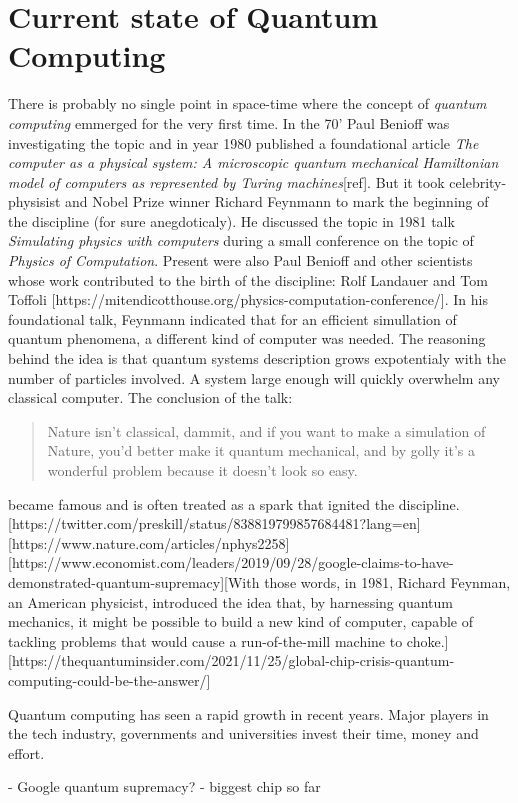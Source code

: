 \chapter{Current state of Quantum Computing}
There is probably no single point in space-time where the concept of \textit{quantum computing} emmerged for the very first time. In the 70' Paul Benioff was investigating the topic and in year 1980 published a foundational article \textit{The computer as a physical system: A microscopic quantum mechanical Hamiltonian model of computers as represented by Turing machines}[ref]. But it took celebrity-physisist and Nobel Prize winner Richard Feynmann to mark the beginning of the discipline (for sure anegdoticaly). He discussed the topic in 1981 talk \textit{Simulating physics with computers} during a small conference on the topic of \textit{Physics of Computation}. Present were also Paul Benioff and other scientists whose work contributed to the birth of the discipline: Rolf Landauer and Tom Toffoli [https://mitendicotthouse.org/physics-computation-conference/]. In his foundational talk, Feynmann indicated that for an efficient simullation of quantum phenomena, a different kind of computer was needed. The reasoning behind the idea is that quantum systems description grows expotentialy with the number of particles involved. A system large enough will quickly overwhelm any classical computer. The conclusion of the talk:
\begin{quote}
Nature isn’t classical, dammit, and if you want to make a simulation of Nature, you’d better make it quantum mechanical, and by golly it’s a wonderful problem because it doesn’t look so easy.
\end{quote}
became famous and is often treated as a spark that ignited the discipline.
[https://twitter.com/preskill/status/838819799857684481?lang=en]
[https://www.nature.com/articles/nphys2258]
[https://www.economist.com/leaders/2019/09/28/google-claims-to-have-demonstrated-quantum-supremacy][With those words, in 1981, Richard Feynman, an American physicist, introduced the idea that, by harnessing quantum mechanics, it might be possible to build a new kind of computer, capable of tackling problems that would cause a run-of-the-mill machine to choke.]
[https://thequantuminsider.com/2021/11/25/global-chip-crisis-quantum-computing-could-be-the-answer/]


Quantum computing has seen a rapid growth in recent years. Major players in the tech industry, governments and universities invest their time, money and effort.

- Google quantum supremacy?
- biggest chip so far



